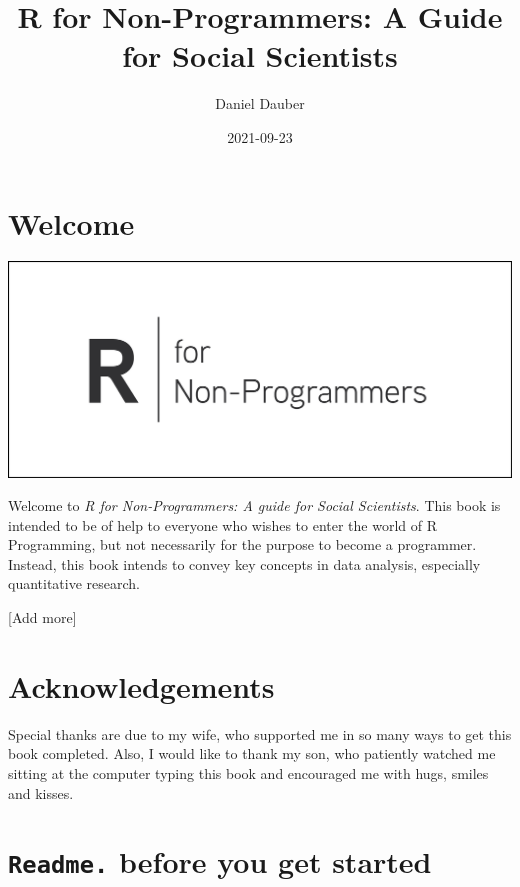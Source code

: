 \documentclass[
]{book}
\title{R for Non-Programmers: A Guide for Social Scientists}
\author{Daniel Dauber}
\date{2021-09-23}
\begin{document}
\maketitle

{
\setcounter{tocdepth}{1}
\tableofcontents
}
\hypertarget{welcome}{%
\chapter*{Welcome 👋}\label{welcome}}

\includegraphics{images/chapter_00_img/r_for_non_programmers_logo.png}

Welcome to \emph{R for Non-Programmers: A guide for Social Scientists}. This book is intended to be of help to everyone who wishes to enter the world of R Programming, but not necessarily for the purpose to become a programmer. Instead, this book intends to convey key concepts in data analysis, especially quantitative research.

{[}Add more{]}

\hypertarget{acknowledgments}{%
\chapter*{Acknowledgements 🙏}\label{acknowledgments}}

Special thanks are due to my wife, who supported me in so many ways to get this book completed. Also, I would like to thank my son, who patiently watched me sitting at the computer typing this book and encouraged me with hugs, smiles and kisses.

\hypertarget{readme-before-you-get-started}{%
\chapter{\texorpdfstring{\texttt{Readme.} before you get started}{Readme. before you get started}}\label{readme-before-you-get-started}}
\end{document}
